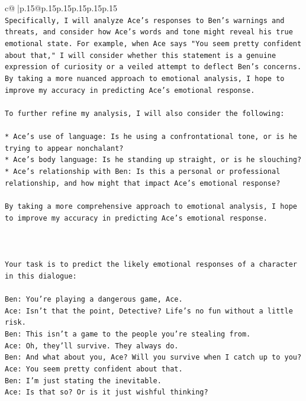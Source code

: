\documentclass{article}
\begin{document}
{\begin{supertabular}{c@{$\;$}|p{.15\linewidth}@{}p{.15\linewidth}p{.15\linewidth}p{.15\linewidth}p{.15\linewidth}p{.15\linewidth}}
{{{\\ 
\texttt{Specifically, I will analyze Ace's responses to Ben's warnings and threats, and consider how Ace's words and tone might reveal his true emotional state. For example, when Ace says "You seem pretty confident about that," I will consider whether this statement is a genuine expression of curiosity or a veiled attempt to deflect Ben's concerns. By taking a more nuanced approach to emotional analysis, I hope to improve my accuracy in predicting Ace's emotional response.} \\
\\ 
\texttt{To further refine my analysis, I will also consider the following:} \\
\\ 
\texttt{* Ace's use of language: Is he using a confrontational tone, or is he trying to appear nonchalant?} \\
\texttt{* Ace's body language: Is he standing up straight, or is he slouching?} \\
\texttt{* Ace's relationship with Ben: Is this a personal or professional relationship, and how might that impact Ace's emotional response?} \\
\\ 
\texttt{By taking a more comprehensive approach to emotional analysis, I hope to improve my accuracy in predicting Ace's emotional response.} \\
\\ 
\\ 
\\ 
\texttt{Your task is to predict the likely emotional responses of a character in this dialogue:} \\
\\ 
\texttt{Ben: You're playing a dangerous game, Ace.} \\
\texttt{Ace: Isn't that the point, Detective? Life's no fun without a little risk.} \\
\texttt{Ben: This isn't a game to the people you're stealing from.} \\
\texttt{Ace: Oh, they'll survive. They always do.} \\
\texttt{Ben: And what about you, Ace? Will you survive when I catch up to you?} \\
\texttt{Ace: You seem pretty confident about that.} \\
\texttt{Ben: I'm just stating the inevitable.} \\
\texttt{Ace: Is that so? Or is it just wishful thinking?} \\
}}}
\end{supertabular}}
\end{document}

